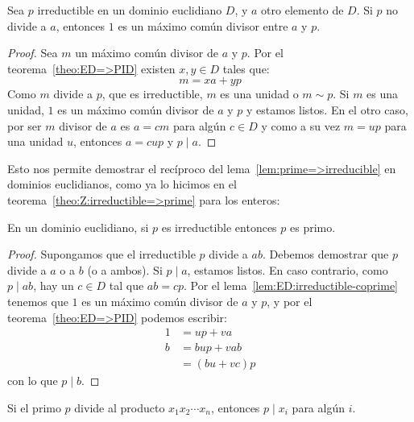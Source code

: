   \begin{lemma}
    \label{lem:ED:irreductible-coprime}
    Sea \(p\) irreductible en un dominio euclidiano \(D\),
    y \(a\) otro elemento de \(D\).
    Si \(p\) no divide a \(a\),
    entonces \(1\) es un máximo común divisor entre \(a\) y \(p\).
  \end{lemma}
  \begin{proof}
    Sea \(m\) un máximo común divisor de \(a\) y \(p\).
    Por el teorema~\ref{theo:ED=>PID}
    existen \(x, y \in D\) tales que:
    \begin{equation*}
      m = x a + y p
    \end{equation*}
    Como \(m\) divide a \(p\),
    que es irreductible,
    \(m\) es una unidad o \(m \sim p\).
    Si \(m\) es una unidad,
    \(1\) es un máximo común divisor de \(a\) y \(p\)
    y estamos listos.
    En el otro caso,
    por ser \(m\) divisor de \(a\)
    es \(a = c m\) para algún \(c \in D\)
    y como a su vez \(m = u p\) para una unidad \(u\),
    entonces \(a = c u p\) y \(p \mid a\).
  \end{proof}
  Esto nos permite demostrar
  el recíproco del lema~\ref{lem:prime=>irreducible}
  en dominios euclidianos,
  como ya lo hicimos en el teorema~\ref{theo:Z:irreductible=>prime}
  para los enteros:
  \begin{theorem}
    \label{theo:ED:irreducible=>prime}
    En un dominio euclidiano,
    si \(p\) es irreductible
    entonces \(p\) es primo.
  \end{theorem}
  \begin{proof}
    Supongamos que el irreductible \(p\) divide a \(a b\).
    Debemos demostrar que \(p\) divide a \(a\) o a \(b\)
    (o a ambos).
    Si \(p \mid a\),
    estamos listos.
    En caso contrario,
    como \(p \mid a b\),
    hay un \(c \in D\) tal que \(a b = c p\).
    Por el lema~\ref{lem:ED:irreductible-coprime}
    tenemos que \(1\) es un máximo común divisor de \(a\) y \(p\),
    y por el teorema~\ref{theo:ED=>PID} podemos escribir:
    \begin{align*}
      1
	&= u p + v a \\
      b
	&= b u p + v a b \\
	&= (b u + v c) p
    \end{align*}
    con lo que \(p \mid b\).
  \end{proof}
  \begin{lemma}
    \label{lem:ED:primo-divide-producto}
    Si el primo \(p\) divide al producto \(x_1 x_2 \dotsm x_n\),
    entonces \(p \mid x_i\) para algún \(i\).
  \end{lemma}
